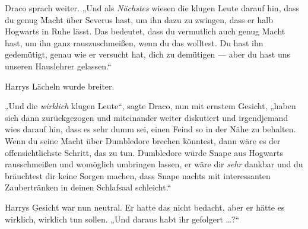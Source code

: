Draco sprach weiter.
„Und als \emph{Nächstes} wiesen die klugen Leute darauf hin, dass du genug Macht über Severus hast, um ihn dazu zu zwingen, dass er halb Hogwarts in Ruhe lässt. Das bedeutet, dass du vermutlich auch genug Macht hast, um ihn ganz rauszuschmeißen, wenn du das wolltest. Du hast ihn gedemütigt, genau wie er versucht hat, dich zu demütigen — aber du hast uns unseren Hauslehrer gelassen.“

Harrys Lächeln wurde breiter.

„Und die \emph{wirklich} klugen Leute“, sagte Draco, nun mit ernstem Gesicht, „haben sich dann zurückgezogen und miteinander weiter diskutiert und irgendjemand wies darauf hin, dass es sehr dumm sei, einen Feind so in der Nähe zu behalten. Wenn du seine Macht über Dumbledore brechen könntest, dann wäre es der offensichtlichste Schritt, das zu tun. Dumbledore würde Snape aus Hogwarts rausschmeißen und womöglich umbringen lassen, er wäre dir \emph{sehr} dankbar und du bräuchtest dir keine Sorgen machen, dass Snape nachts mit interessanten Zaubertränken in deinen Schlafsaal schleicht.“

Harrys Gesicht war nun neutral. Er hatte das nicht bedacht, aber er hätte es wirklich, wirklich tun sollen.
„Und daraus habt ihr gefolgert …?“

